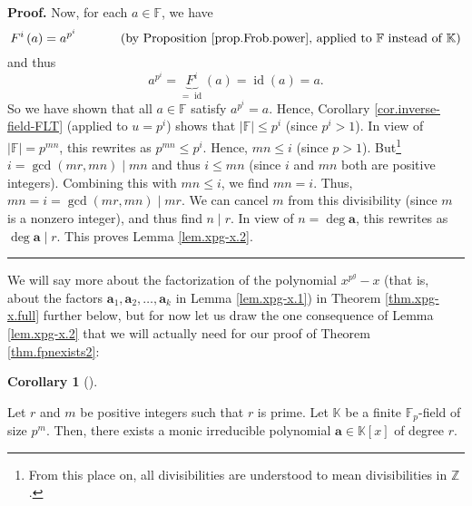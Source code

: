 \documentclass[numbers=enddot,12pt,final,onecolumn,notitlepage]{scrartcl}%
\theoremstyle{definition}
\newtheorem{coro}[theo]{Corollary}
\newenvironment{corollary}[1][]
{\begin{coro}[#1]\begin{leftbar}}
{\end{leftbar}\end{coro}}
\newenvironment{proof}[1][Proof]{\noindent\textbf{#1.} }{\ \rule{0.5em}{0.5em}}
\begin{document}
\begin{proof}
Now, for each $a\in\mathbb{F}$, we have%
\[
F^{i}\left(  a\right)  =a^{p^{i}}\ \ \ \ \ \ \ \ \ \ \left(  \text{by
Proposition \ref{prop.Frob.power}, applied to }\mathbb{F}\text{ instead of
}\mathbb{K}\right)
\]
and thus%
\[
a^{p^{i}}=\underbrace{F^{i}}_{=\operatorname*{id}}\left(  a\right)
=\operatorname*{id}\left(  a\right)  =a.
\]
So we have shown that all $a\in\mathbb{F}$ satisfy $a^{p^{i}}=a$. Hence,
Corollary \ref{cor.inverse-field-FLT} (applied to $u=p^{i}$) shows that
$\left\vert \mathbb{F}\right\vert \leq p^{i}$ (since $p^{i}>1$). In view of
$\left\vert \mathbb{F}\right\vert =p^{mn}$, this rewrites as $p^{mn}\leq
p^{i}$. Hence, $mn\leq i$ (since $p>1$). But\footnote{From this place on, all
divisibilities are understood to mean divisibilities in $\mathbb{Z}$.}
$i=\gcd\left(  mr,mn\right)  \mid mn$ and thus $i\leq mn$ (since $i$ and $mn$
both are positive integers). Combining this with $mn\leq i$, we find $mn=i$.
Thus, $mn=i=\gcd\left(  mr,mn\right)  \mid mr$. We can cancel $m$ from this
divisibility (since $m$ is a nonzero integer), and thus find $n\mid r$. In
view of $n=\deg\mathbf{a}$, this rewrites as $\deg\mathbf{a}\mid r$. This
proves Lemma \ref{lem.xpg-x.2}.
\end{proof}

We will say more about the factorization of the polynomial $x^{p^{g}}-x$ (that
is, about the factors $\mathbf{a}_{1},\mathbf{a}_{2},\ldots,\mathbf{a}_{k}$ in
Lemma \ref{lem.xpg-x.1}) in Theorem \ref{thm.xpg-x.full} further below, but
for now let us draw the one consequence of Lemma \ref{lem.xpg-x.2} that we
will actually need for our proof of Theorem \ref{thm.fpnexists2}:

\begin{corollary}
\label{cor.xpg-x.prime}Let $r$ and $m$ be positive integers such that $r$ is
prime. Let $\mathbb{K}$ be a finite $\mathbb{F}_{p}$-field of size $p^{m}$.
Then, there exists a monic irreducible polynomial $\mathbf{a}\in
\mathbb{K}\left[  x\right]  $ of degree $r$.
\end{corollary}
\end{document}
